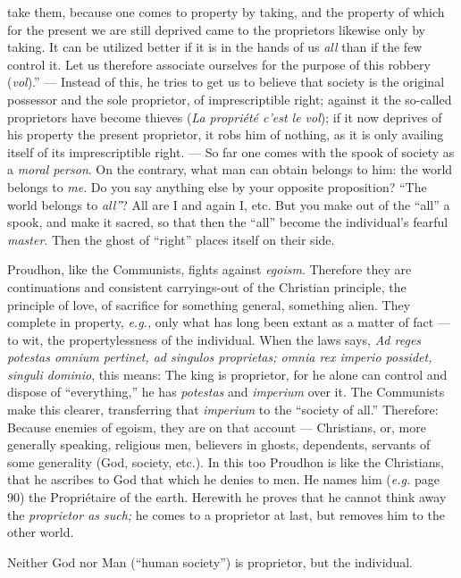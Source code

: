 take them, because one comes to property by taking, and the property of which 
for the present we are still deprived came to the proprietors likewise only by 
taking. It can be utilized better if it is in the hands of us \textit{all} 
than if the few control it. Let us therefore associate ourselves for the 
purpose of this robbery (\textit{vol}).'' --- Instead of this, he tries to get 
us to believe that society is the original possessor and the sole proprietor, 
of imprescriptible right; against it the so-called proprietors have become 
thieves (\textit{La propri\'et\'e c'est le vol}); if it now deprives of his 
property the present proprietor, it robs him of nothing, as it is only 
availing itself of its imprescriptible right. --- So far one comes with the 
spook of society as a \textit{moral person}. On the contrary, what man can 
obtain belongs to him: the world belongs to \textit{me}. Do you say anything 
else by your opposite proposition? ``The world belongs to \textit{all''}? 
All are I and again I, etc. But you make out of the ``all'' a spook, and 
make it sacred, so that then the ``all'' become the individual's fearful 
\textit{master}. Then the ghost of ``right'' places itself on their side.

Proudhon, like the Communists, fights against \textit{egoism}. Therefore they 
are continuations and consistent carryings-out of the Christian principle, the 
principle of love, of sacrifice for something general, something alien. They 
complete in property, \textit{e.g.,} only what has long been extant as a 
matter of fact --- to wit, the propertylessness of the individual. When the 
laws says, \textit{Ad reges potestas omnium pertinet, ad singulos proprietas; 
omnia rex imperio possidet, singuli dominio}, this means: The king is 
proprietor, for he alone can control and dispose of ``everything,'' he has 
\textit{potestas} and \textit{imperium} over it. The Communists make this 
clearer, transferring that \textit{imperium} to the ``society of all.'' 
Therefore: Because enemies of egoism, they are on that account --- Christians, 
or, more generally speaking, religious men, believers in ghosts, dependents, 
servants of some generality (God, society, etc.). In this too Proudhon is like 
the Christians, that he ascribes to God that which he denies to men. He names 
him (\textit{e.g.} page 90) the Propri\'etaire of the earth. Herewith he 
proves that he cannot think away the \textit{proprietor as such;} he comes to 
a proprietor at last, but removes him to the other world.

Neither God nor Man (``human society'') is proprietor, but the individual.

